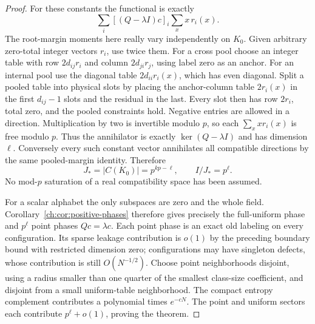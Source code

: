 \begin{proof}
For these constants the functional is exactly
\[
 \sum_i[(Q-\lambda I)c]_i\sum_xx\,r_i(x).
\]
The root-margin moments here really vary independently on $K_0$.
Given arbitrary zero-total integer vectors $r_i$, use twice them.
For a cross pool choose an integer table with row $2d_{ij}r_i$
and column $2d_{ji}r_j$, using label zero as an anchor.
For an internal pool use the diagonal table $2d_{ii}r_i(x)$,
which has even diagonal. Split a pooled table into physical slots
by placing the anchor-column table $2r_i(x)$ in the first
$d_{ij}-1$ slots and the residual in the last. Every slot then has
row $2r_i$, total zero, and the pooled constraints hold.
Negative entries are allowed in a direction. Multiplication by two
is invertible modulo $p$, so each $\sum_xx r_i(x)$ is free modulo
$p$. Thus the annihilator is exactly $\ker(Q-\lambda I)$ and has
dimension $\ell$. Conversely every such constant vector annihilates
all compatible directions by the same pooled-margin identity.
Therefore
\[
 J_*=|C(K_0)|=p^{kp-\ell},\qquad I/J_*=p^\ell.
\]
No mod-$p$ saturation of a real compatibility space has been assumed.

For a scalar alphabet the only subspaces are zero and the whole
field. Corollary~\ref{ch:cor:positive-phases} therefore gives precisely
the full-uniform phase and $p^\ell$ point phases $Qc=\lambda c$.
Each point phase is an exact old labeling on every configuration.
Its sparse leakage contribution is $o(1)$ by the preceding boundary
bound with restricted dimension zero; configurations may have
singleton defects, whose contribution is still
$O(N^{-1/2})$. Choose point neighborhoods disjoint, using a radius
smaller than one quarter of the smallest class-size coefficient,
and disjoint from a small uniform-table neighborhood. The compact
entropy complement contributes a polynomial times $e^{-cN}$.
The point and uniform sectors each contribute $p^\ell+o(1)$,
proving the theorem.
\end{proof}

